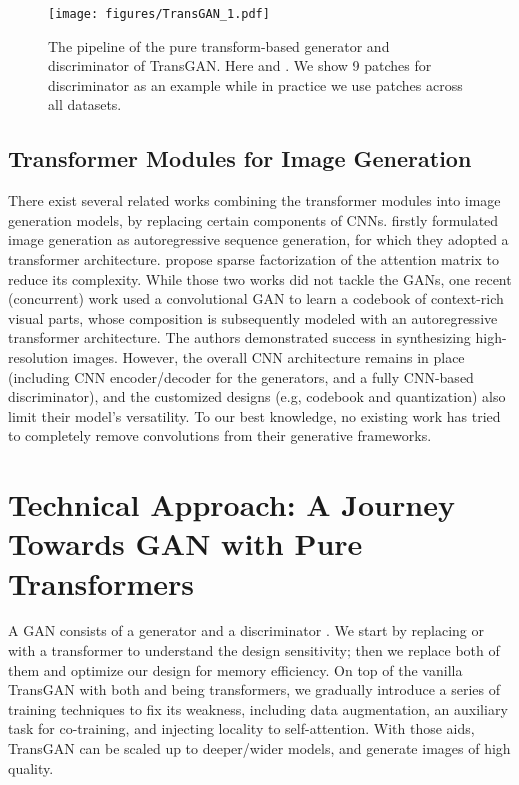 \documentclass{article}
\begin{document}
\begin{figure*}[t]
\begin{center}
\texttt{[image: figures/TransGAN\_1.pdf]}
\end{center}
\vspace{-1em}
\caption{The pipeline of the pure transform-based generator and discriminator of TransGAN. Here  and . We show 9 patches for discriminator as an example while in practice we use  patches across all datasets.}
\label{fig:TransGAN}
\end{figure*}

\subsection{Transformer Modules for Image Generation}
\vspace{-0.2em}
There exist several related works combining the transformer modules into image generation models, by replacing certain components of CNNs. \cite{parmar2018image} firstly formulated image generation as autoregressive sequence generation, for which they adopted a transformer architecture. \cite{child2019generating} propose sparse factorization of the attention matrix to reduce its complexity. While those two works did not tackle the GANs, one recent (concurrent) work \cite{esser2020taming}  used a convolutional GAN to learn a codebook of context-rich visual parts, whose composition is subsequently modeled with an autoregressive transformer architecture. The authors demonstrated success in synthesizing high-resolution images. However, the overall CNN architecture remains in place (including CNN encoder/decoder for the generators, and a fully CNN-based discriminator), and the customized designs (e.g, codebook and quantization) also limit their model's versatility. To our best knowledge, no existing work has tried to completely remove convolutions from their generative frameworks. 















\section{Technical Approach: A Journey Towards GAN with Pure Transformers}
\label{sec:techniques}
A GAN consists of a generator  and a discriminator . We start by replacing  or  with a transformer to understand the design sensitivity; then we replace both of them and optimize our design for memory efficiency. On top of the vanilla TransGAN with both  and  being transformers, we gradually introduce a series of training techniques to fix its weakness, including data augmentation, an auxiliary task for co-training, and injecting locality to self-attention. With those aids, TransGAN can be scaled up to deeper/wider models, and generate images of high quality.
\end{document}
